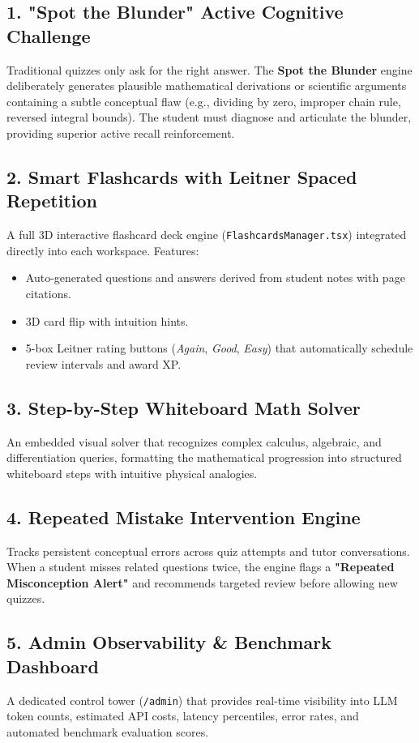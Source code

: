 \documentclass[11pt,a4paper]{article}
\begin{document}
\subsection{1. "Spot the Blunder" Active Cognitive Challenge}
Traditional quizzes only ask for the right answer. The \textbf{Spot the Blunder} engine deliberately generates plausible mathematical derivations or scientific arguments containing a subtle conceptual flaw (e.g., dividing by zero, improper chain rule, reversed integral bounds). The student must diagnose and articulate the blunder, providing superior active recall reinforcement.

\subsection{2. Smart Flashcards with Leitner Spaced Repetition}
A full 3D interactive flashcard deck engine (\texttt{FlashcardsManager.tsx}) integrated directly into each workspace. Features:
\begin{itemize}[noitemsep]
    \item Auto-generated questions and answers derived from student notes with page citations.
    \item 3D card flip with intuition hints.
    \item 5-box Leitner rating buttons (\textit{Again}, \textit{Good}, \textit{Easy}) that automatically schedule review intervals and award XP.
\end{itemize}

\subsection{3. Step-by-Step Whiteboard Math Solver}
An embedded visual solver that recognizes complex calculus, algebraic, and differentiation queries, formatting the mathematical progression into structured whiteboard steps with intuitive physical analogies.

\subsection{4. Repeated Mistake Intervention Engine}
Tracks persistent conceptual errors across quiz attempts and tutor conversations. When a student misses related questions twice, the engine flags a \textbf{"Repeated Misconception Alert"} and recommends targeted review before allowing new quizzes.

\subsection{5. Admin Observability \& Benchmark Dashboard}
A dedicated control tower (\texttt{/admin}) that provides real-time visibility into LLM token counts, estimated API costs, latency percentiles, error rates, and automated benchmark evaluation scores.
\end{document}
